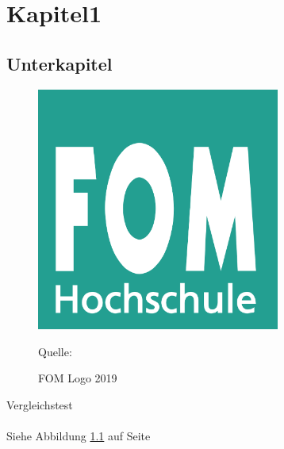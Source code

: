 \chapter{Kapitel1}
\blindtext{}

\section{Unterkapitel}
\blindtext{}
\blindtext{}
\begin{figure}[H] 
   \centering 
   \caption{FOM Logo 2019} 
   \label{fig:fom_logo} 
   \includegraphics[width=8cm]{Abbildungen/fom_logo.png} 
   \par\smallskip 
   Quelle: \cite[12]{elk} 
\end{figure} 

Vergleichstest\autocite[Vgl.][12]{elk}\\
\\
Siehe Abbildung \ref{fig:fom_logo} auf Seite \pageref{fig:fom_logo}